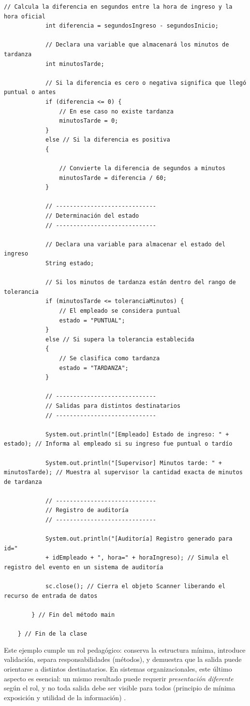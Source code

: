 \documentclass[12pt,twoside]{book}
\begin{document}
\begin{lstlisting}[style=Java,caption={Programa Java mínimo para registrar ingreso del personal (entrada por teclado).},label={lst:RegistroIngresoJavaMin}]
			// Calcula la diferencia en segundos entre la hora de ingreso y la hora oficial
			int diferencia = segundosIngreso - segundosInicio;
			
			// Declara una variable que almacenará los minutos de tardanza
			int minutosTarde;
			
			// Si la diferencia es cero o negativa significa que llegó puntual o antes
			if (diferencia <= 0) {
				// En ese caso no existe tardanza
				minutosTarde = 0;
			} 
			else // Si la diferencia es positiva
			{
				
				// Convierte la diferencia de segundos a minutos
				minutosTarde = diferencia / 60;
			}
			
			// -----------------------------
			// Determinación del estado
			// -----------------------------
			
			// Declara una variable para almacenar el estado del ingreso
			String estado;
			
			// Si los minutos de tardanza están dentro del rango de tolerancia
			if (minutosTarde <= toleranciaMinutos) {
				// El empleado se considera puntual
				estado = "PUNTUAL";                                  
			} 
			else // Si supera la tolerancia establecida
			{
				// Se clasifica como tardanza                           
				estado = "TARDANZA";
			}
			
			// -----------------------------
			// Salidas para distintos destinatarios
			// -----------------------------
			
			System.out.println("[Empleado] Estado de ingreso: " + estado); // Informa al empleado si su ingreso fue puntual o tardío
			
			System.out.println("[Supervisor] Minutos tarde: " + minutosTarde); // Muestra al supervisor la cantidad exacta de minutos de tardanza
			
			// -----------------------------
			// Registro de auditoría
			// -----------------------------
			
			System.out.println("[Auditoría] Registro generado para id=" 
			+ idEmpleado + ", hora=" + horaIngreso); // Simula el registro del evento en un sistema de auditoría
			
			sc.close(); // Cierra el objeto Scanner liberando el recurso de entrada de datos
			
		} // Fin del método main
		
	} // Fin de la clase \end{lstlisting}
					
					\noindent
					Este ejemplo cumple un rol pedagógico: conserva la estructura mínima, introduce validación, separa responsabilidades (métodos), y demuestra que la salida puede orientarse a distintos destinatarios. En sistemas organizacionales, este último aspecto es esencial: un mismo resultado puede requerir \emph{presentación diferente} según el rol, y no toda salida debe ser visible para todos (principio de mínima exposición y utilidad de la información) \cite{Laudon2020Management,Kendall2014Systems,Pressman2019Software}.
					
\end{document}
